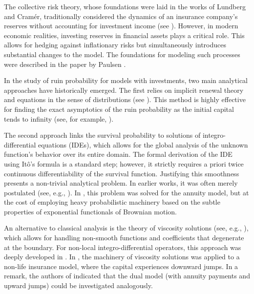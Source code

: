 \documentclass[smallextended]{svjour3}
\begin{document}
The collective risk theory, whose foundations were laid in the works of Lundberg and Cram\'{e}r, traditionally considered the dynamics of an insurance company's reserves without accounting for investment income (see \cite{Asmussen2010}). However, in modern economic realities, investing reserves in financial assets plays a critical role. This allows for hedging against inflationary risks but simultaneously introduces substantial changes to the model. The foundations for modeling such processes were described in the paper by Paulsen \cite{Paulsen1993}.

In the study of ruin probability for models with investments, two main analytical approaches have historically emerged. The first relies on implicit renewal theory and equations in the sense of distributions (see \cite{Goldie1991}). This method is highly effective for finding the exact asymptotics of the ruin probability as the initial capital tends to infinity (see, for example, \cite{Frolova2002,KLP2026,KPro2023}).

The second approach links the survival probability to solutions of integro-differential equations (IDEs), which allows for the global analysis of the unknown function's behavior over its entire domain. The formal derivation of the IDE using It\^{o}'s formula is a standard step; however, it strictly requires a priori twice continuous differentiability of the survival function. Justifying this smoothness presents a non-trivial analytical problem. In earlier works, it was often merely postulated (see, e.g., \cite{PG1997,WW2001}). In \cite{KP2016}, this problem was solved for the annuity model, but at the cost of employing heavy probabilistic machinery based on the subtle properties of exponential functionals of Brownian motion.

An alternative to classical analysis is the theory of viscosity solutions (see, e.g., \cite{Crandall1992,Fleming1993}), which allows for handling non-smooth functions and coefficients that degenerate at the boundary. For non-local integro-differential operators, this approach was deeply developed in \cite{Barles2008}. In \cite{BK2015}, the machinery of viscosity solutions was applied to a non-life insurance model, where the capital experiences downward jumps. In a remark, the authors of \cite{BK2015} indicated that the dual model (with annuity payments and upward jumps) could be investigated analogously.
\end{document}
